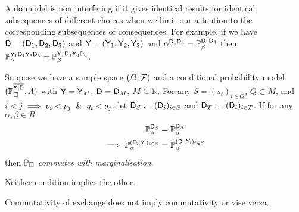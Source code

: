 A do model is non interfering if it gives identical results for identical subsequences of different choices when we limit our attention to the corresponding subsequences of consequences. For example, if we have $\mathsf{D}=(\mathsf{D}_1,\mathsf{D}_2,\mathsf{D}_3)$ and $\mathsf{Y}=(\mathsf{Y}_1,\mathsf{Y}_2,\mathsf{Y}_3)$ and $\alpha^{\mathsf{D}_1\mathsf{D}_3}=\mathbb{P}_\beta^{\mathsf{D}_1\mathsf{D}_3}$ then $\mathbb{P}_{\alpha}^{\mathsf{Y}_1\mathsf{D}_1\mathsf{Y}_3\mathsf{D}_3}=\mathbb{P}_\beta^{\mathsf{Y}_1\mathsf{D}_1\mathsf{Y}_3\mathsf{D}_3}$.

\begin{definition}\label{def:caus_cont}
Suppose we have a sample space $(\Omega,\mathcal{F})$ and a conditional probability model $(\mathbb{P}_{\square}^{\overline{\mathsf{Y}|\mathsf{D}}},A)$ with $\mathsf{Y}=\mathsf{Y}_M$, $\mathsf{D}=\mathsf{D}_M$, $M\subseteq \mathbb{N}$. For any $S=(s_i)_{i\in Q}$, $Q\subset M$, and $i<j\implies p_i<p_j \And q_i<q_j$, let $\mathsf{D}_S:=(\mathsf{D}_i)_{i\in S}$ and $\mathsf{D}_T:=(\mathsf{D}_i)_{i\in T}$. If for any $\alpha,\beta\in R$
\begin{align}
    \mathbb{P}_\alpha^{\mathsf{D}_{S}}&=\mathbb{P}_\beta^{\mathsf{D}_{S}}\\
    \implies \mathbb{P}_\alpha^{(\mathsf{D_i,Y_i})_{i\in S}}&=\mathbb{P}_\beta^{(\mathsf{D_i,Y_i})_{i\in S}}
\end{align}
then $\mathbb{P}_\square$ \emph{commutes with marginalisation}.
\end{definition}

Neither condition implies the other. 
\begin{lemma}
Commutativity of exchange does not imply commutativity or vise versa.
\end{lemma}

